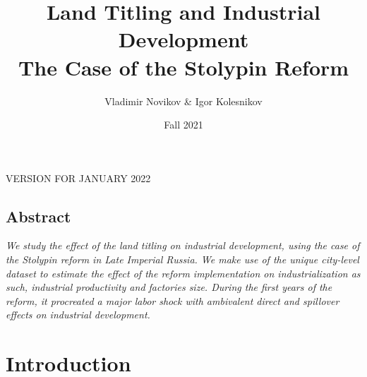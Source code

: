 \documentclass[a4paper, 12pt]{article}
\title{%
Land Titling and Industrial Development\\
\Large The Case of the Stolypin Reform}
\author{Vladimir Novikov \& Igor Kolesnikov}
\date{Fall 2021}
\begin{document}
\maketitle

\noindent VERSION FOR JANUARY 2022

\subsection*{Abstract}

\textit{We study the effect of the land titling on industrial development, using the case of the Stolypin reform in Late Imperial Russia. We make use of the unique city-level dataset to estimate the effect of the reform implementation on industrialization as such, industrial productivity and factories size. During the first years of the reform, it procreated a major labor shock with ambivalent direct and spillover effects on industrial development.}


\section{Introduction}
\end{document}
